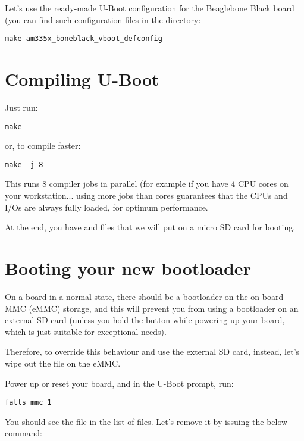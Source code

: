 Let's use the ready-made U-Boot configuration for the Beaglebone Black
board (you can find such configuration files in the 
directory:

\begin{verbatim}
make am335x_boneblack_vboot_defconfig
\end{verbatim}

\section{Compiling U-Boot}

Just run:
\begin{verbatim}
make
\end{verbatim}

or, to compile faster:

\begin{verbatim}
make -j 8
\end{verbatim}

This runs 8 compiler jobs in parallel (for example if you have 4 CPU
cores on your workstation... using more jobs than cores guarantees that
the CPUs and I/Os are always fully loaded, for optimum performance.

At the end, you have  and  files that we will
put on a micro SD card for booting.



\section{Booting your new bootloader}

On a board in a normal state, there should be a bootloader on the on-board MMC
(eMMC) storage, and this will prevent you from using a bootloader on an
external SD card (unless you hold the  button while powering
up your board, which is just suitable for exceptional needs).

Therefore, to override this behaviour and use the external SD card,
instead, let's wipe out the  file on the eMMC.

Power up or reset your board, and in the U-Boot prompt, run:

\begin{verbatim}
fatls mmc 1
\end{verbatim}

You should see the  file in the list of files. Let's remove it
by issuing the below command:

